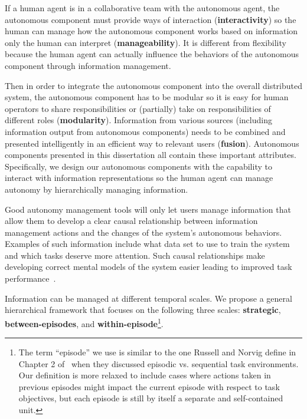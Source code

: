 If a human agent is in a collaborative team with the autonomous agent, the autonomous component must provide ways of interaction (\textbf{interactivity}) so the human can manage how the autonomous component works based on information only the human can interpret (\textbf{manageability}). It is different from flexibility because the human agent can actually influence the behaviors of the autonomous component through information management. 

Then in order to integrate the autonomous component into the overall distributed system, the autonomous component has to be modular so it is easy for human operators to share responsibilities or (partially) take on responsibilities of different roles (\textbf{modularity}). Information from various sources (including information output from autonomous components) needs to be combined and presented intelligently in an efficient way to relevant users (\textbf{fusion}). Autonomous components presented in this dissertation all contain these important attributes. Specifically, we design our autonomous components with the capability to interact with information representations so the human agent can manage autonomy by hierarchically managing information. 

Good autonomy management tools will only let users manage information that allow them to develop a clear causal relationship between information management actions and the changes of the system's autonomous behaviors. Examples of such information include what data set to use to train the system and which tasks deserve more attention. Such causal relationships make developing correct mental models of the system easier leading to improved task performance~\cite{Moray1990Lattice}. 

Information can be managed at different temporal scales. 
We propose a general hierarchical framework that focuses on the following three scales: \textbf{strategic}, \textbf{between-episodes}, and \textbf{within-episode}\footnote{The term ``episode'' we use is similar to the one Russell and Norvig define in Chapter 2 of~\cite{Russell2009Artificial} when they discussed episodic vs. sequential task environments. Our definition is more relaxed to include cases where actions taken in previous episodes might impact the current episode with respect to task objectives, but each episode is still by itself a separate and self-contained unit.}. 

